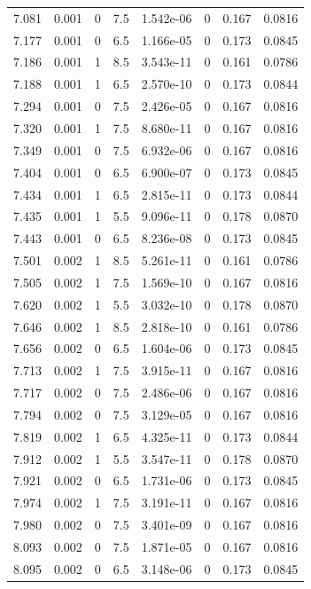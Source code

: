 \documentclass[preview]{standalone}
\begin{document}
{{{{{\begin{tabular}{L{1.2cm}C{1.2cm} C{0.3cm}C{0.5cm} C{1.4cm}C{1.4cm} C{1.4cm}C{1.4cm}}
  7.081  &  0.001  & 0     & 7.5 &  1.542e-06  & 0  & 0.167 &  0.0816   \\ 
  7.177  &  0.001  & 0     & 6.5 &  1.166e-05  & 0  & 0.173 &  0.0845   \\ 
  7.186  &  0.001  & 1     & 8.5 &  3.543e-11  & 0  & 0.161 &  0.0786   \\ 
  7.188  &  0.001  & 1     & 6.5 &  2.570e-10  & 0  & 0.173 &  0.0844   \\ 
  7.294  &  0.001  & 0     & 7.5 &  2.426e-05  & 0  & 0.167 &  0.0816   \\ 
  7.320  &  0.001  & 1     & 7.5 &  8.680e-11  & 0  & 0.167 &  0.0816   \\ 
  7.349  &  0.001  & 0     & 7.5 &  6.932e-06  & 0  & 0.167 &  0.0816   \\ 
  7.404  &  0.001  & 0     & 6.5 &  6.900e-07  & 0  & 0.173 &  0.0845   \\ 
  7.434  &  0.001  & 1     & 6.5 &  2.815e-11  & 0  & 0.173 &  0.0844   \\ 
  7.435  &  0.001  & 1     & 5.5 &  9.096e-11  & 0  & 0.178 &  0.0870   \\ 
  7.443  &  0.001  & 0     & 6.5 &  8.236e-08  & 0  & 0.173 &  0.0845   \\ 
  7.501  &  0.002  & 1     & 8.5 &  5.261e-11  & 0  & 0.161 &  0.0786   \\ 
  7.505  &  0.002  & 1     & 7.5 &  1.569e-10  & 0  & 0.167 &  0.0816   \\ 
  7.620  &  0.002  & 1     & 5.5 &  3.032e-10  & 0  & 0.178 &  0.0870   \\ 
  7.646  &  0.002  & 1     & 8.5 &  2.818e-10  & 0  & 0.161 &  0.0786   \\ 
  7.656  &  0.002  & 0     & 6.5 &  1.604e-06  & 0  & 0.173 &  0.0845   \\ 
  7.713  &  0.002  & 1     & 7.5 &  3.915e-11  & 0  & 0.167 &  0.0816   \\ 
  7.717  &  0.002  & 0     & 7.5 &  2.486e-06  & 0  & 0.167 &  0.0816   \\ 
  7.794  &  0.002  & 0     & 7.5 &  3.129e-05  & 0  & 0.167 &  0.0816   \\ 
  7.819  &  0.002  & 1     & 6.5 &  4.325e-11  & 0  & 0.173 &  0.0844   \\ 
  7.912  &  0.002  & 1     & 5.5 &  3.547e-11  & 0  & 0.178 &  0.0870   \\ 
  7.921  &  0.002  & 0     & 6.5 &  1.731e-06  & 0  & 0.173 &  0.0845   \\ 
  7.974  &  0.002  & 1     & 7.5 &  3.191e-11  & 0  & 0.167 &  0.0816   \\ 
  7.980  &  0.002  & 0     & 7.5 &  3.401e-09  & 0  & 0.167 &  0.0816   \\ 
  8.093  &  0.002  & 0     & 7.5 &  1.871e-05  & 0  & 0.167 &  0.0816   \\ 
  8.095  &  0.002  & 0     & 6.5 &  3.148e-06  & 0  & 0.173 &  0.0845   \\ 
\hline 
\end{tabular} 

}}}}}
\end{document}
